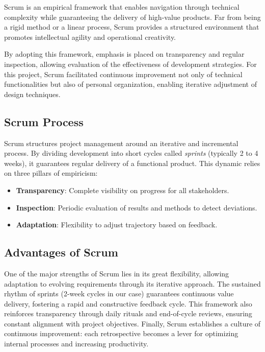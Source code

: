 Scrum \cite{scrumguide} is an empirical framework that enables navigation through technical complexity while guaranteeing the delivery of high-value products. Far from being a rigid method or a linear process, Scrum provides a structured environment that promotes intellectual agility and operational creativity.

By adopting this framework, emphasis is placed on transparency and regular inspection, allowing evaluation of the effectiveness of development strategies. For this project, Scrum facilitated continuous improvement not only of technical functionalities but also of personal organization, enabling iterative adjustment of design techniques.

\subsection{Scrum Process}

Scrum structures project management around an iterative and incremental process. By dividing development into short cycles called \textit{sprints} (typically 2 to 4 weeks), it guarantees regular delivery of a functional product. This dynamic relies on three pillars of empiricism:

\begin{itemize}
    \item \textbf{Transparency}: Complete visibility on progress for all stakeholders.
    \item \textbf{Inspection}: Periodic evaluation of results and methods to detect deviations.
    \item \textbf{Adaptation}: Flexibility to adjust trajectory based on feedback.
\end{itemize}


\subsection{Advantages of Scrum}

One of the major strengths of Scrum lies in its great flexibility, allowing adaptation to evolving requirements through its iterative approach. The sustained rhythm of sprints (2-week cycles in our case) guarantees continuous value delivery, fostering a rapid and constructive feedback cycle. This framework also reinforces transparency through daily rituals and end-of-cycle reviews, ensuring constant alignment with project objectives. Finally, Scrum establishes a culture of continuous improvement: each retrospective becomes a lever for optimizing internal processes and increasing productivity.

